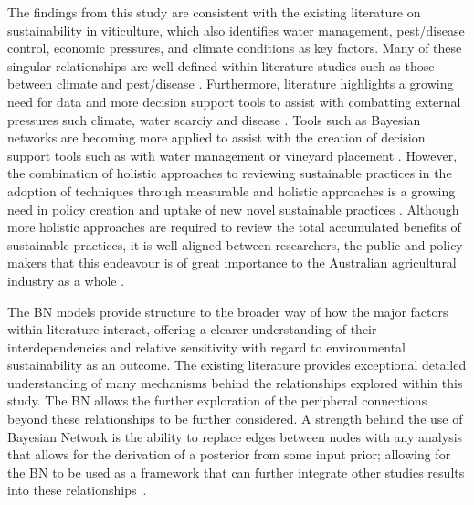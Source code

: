 The findings from this study are consistent with the existing literature on sustainability in viticulture, which also identifies water management, pest/disease control, economic pressures, and climate conditions as key factors. Many of these singular relationships are well-defined within literature studies such as those between climate and pest/disease \cite{olatinwoChapterWeatherbasedPest2014}. Furthermore, literature  highlights a growing need for data and more decision support tools to assist with combatting external pressures such climate, water scarciy and disease \cite{naigeonDATADecisionmakingViticulture2023,stefaniniBayesianCausalModel2022,fincoCombiningPrecisionViticulture2022a,laurentLocalInfluenceClimate2022}. Tools such as Bayesian networks are becoming more applied to assist with the creation of decision support tools such as with water management \cite{carmonaUseParticipatoryObjectOriented2011} or vineyard placement \cite{abbalDecisionSupportSystem2016}. However, the combination of holistic approaches to reviewing sustainable practices in the adoption of techniques through measurable and holistic approaches is a growing need in policy creation and uptake of new novel sustainable practices \autocite{mayfieldDesigningExpertledBayesian2023,baianoOverviewSustainabilityWine2021,dichiaraCollaborativeApproachAchieving2024}. Although more holistic approaches are required to review the total accumulated benefits of sustainable practices, it is well aligned between researchers, the public and policy-makers that this endeavour is of great importance to the Australian agricultural industry as a whole \cite{dumbrellComparingAustralianPublic2024}.

The BN models provide structure to the broader way of how the major factors within literature interact, offering a clearer understanding of their interdependencies and relative sensitivity with regard to environmental sustainability as an outcome. The existing literature provides exceptional detailed understanding of many mechanisms behind the relationships explored within this study. The BN allows the further exploration of the peripheral connections beyond these relationships to be further considered. A strength behind the use of Bayesian Network is the ability to replace edges between nodes with any analysis that allows for the derivation of a posterior from some input prior; allowing for the BN to be used as a framework that can further integrate other studies results into these relationships~\cite{kimphuctranMachineLearningProbabilistic2022,kollerObjectOrientedBayesianNetworks1997,korbBayesianArtificialIntelligence2011}.

